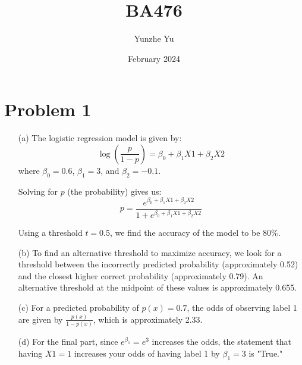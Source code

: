 \documentclass{article}
\title{BA476}
\author{Yunzhe Yu}
\date{February 2024}
\begin{document}
\maketitle

\section*{Problem 1}
\begin{itemize}
    \item [(a)]
        The logistic regression model is given by:
        \[
        \log\left(\frac{p}{1-p}\right) = \beta_0 + \beta_1 X1 + \beta_2 X2
        \]
        where \( \beta_0 = 0.6 \), \( \beta_1 = 3 \), and \( \beta_2 = -0.1 \).
        
        Solving for \( p \) (the probability) gives us:
        \[
        p = \frac{e^{\beta_0 + \beta_1 X1 + \beta_2 X2}}{1 + e^{\beta_0 + \beta_1 X1 + \beta_2 X2}}
        \]
        
        Using a threshold \( t = 0.5 \), we find the accuracy of the model to be 80\%.

    \item[(b)] 
        To find an alternative threshold to maximize accuracy, we look for a threshold between the incorrectly predicted probability (approximately 0.52) and the closest higher correct probability (approximately 0.79). An alternative threshold at the midpoint of these values is approximately 0.655.

    \item[(c)]
        For a predicted probability of \( p(x) = 0.7 \), the odds of observing label 1 are given by \( \frac{p(x)}{1 - p(x)} \), which is approximately 2.33.

    \item[(d)]
        For the final part, since \( e^{\beta_1} = e^3 \) increases the odds, the statement that having \( X1 = 1 \) increases your odds of having label 1 by \( \beta_1 = 3 \) is "True."
\end{itemize}
\newpage
\end{document}

